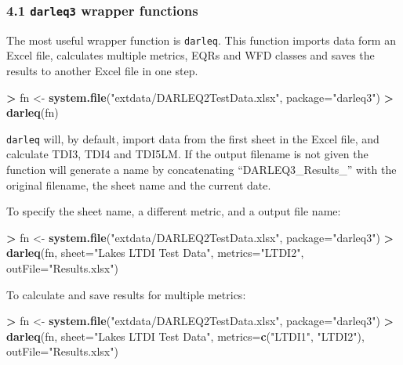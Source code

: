 \documentclass[
]{article}
\newenvironment{Shaded}{\begin{snugshade}}{\end{snugshade}}
\newcommand{\DataTypeTok}[1]{\textcolor[rgb]{0.13,0.29,0.53}{#1}}
\newcommand{\KeywordTok}[1]{\textcolor[rgb]{0.13,0.29,0.53}{\textbf{#1}}}
\newcommand{\NormalTok}[1]{#1}
\newcommand{\OperatorTok}[1]{\textcolor[rgb]{0.81,0.36,0.00}{\textbf{#1}}}
\newcommand{\StringTok}[1]{\textcolor[rgb]{0.31,0.60,0.02}{#1}}
\begin{document}
\hypertarget{darleq3-wrapper-functions}{%
\subsubsection{\texorpdfstring{4.1 \texttt{darleq3} wrapper
functions}{4.1 darleq3 wrapper functions}}\label{darleq3-wrapper-functions}}

The most useful wrapper function is \texttt{darleq}. This function
imports data form an Excel file, calculates multiple metrics, EQRs and
WFD classes and saves the results to another Excel file in one step.

\begin{Shaded}
\begin{Highlighting}[]
\OperatorTok{>}\StringTok{ }\NormalTok{fn <-}\StringTok{ }\KeywordTok{system.file}\NormalTok{(}\StringTok{"extdata/DARLEQ2TestData.xlsx"}\NormalTok{, }\DataTypeTok{package=}\StringTok{"darleq3"}\NormalTok{)}
\OperatorTok{>}\StringTok{ }\KeywordTok{darleq}\NormalTok{(fn)}
\end{Highlighting}
\end{Shaded}

\texttt{darleq} will, by default, import data from the first sheet in
the Excel file, and calculate TDI3, TDI4 and TDI5LM. If the output
filename is not given the function will generate a name by concatenating
``DARLEQ3\_Results\_'' with the original filename, the sheet name and
the current date.

To specify the sheet name, a different metric, and a output file name:

\begin{Shaded}
\begin{Highlighting}[]
\OperatorTok{>}\StringTok{ }\NormalTok{fn <-}\StringTok{ }\KeywordTok{system.file}\NormalTok{(}\StringTok{"extdata/DARLEQ2TestData.xlsx"}\NormalTok{, }\DataTypeTok{package=}\StringTok{"darleq3"}\NormalTok{)}
\OperatorTok{>}\StringTok{ }\KeywordTok{darleq}\NormalTok{(fn, }\DataTypeTok{sheet=}\StringTok{"Lakes LTDI Test Data"}\NormalTok{, }\DataTypeTok{metrics=}\StringTok{"LTDI2"}\NormalTok{, }\DataTypeTok{outFile=}\StringTok{"Results.xlsx"}\NormalTok{)}
\end{Highlighting}
\end{Shaded}

To calculate and save results for multiple metrics:

\begin{Shaded}
\begin{Highlighting}[]
\OperatorTok{>}\StringTok{ }\NormalTok{fn <-}\StringTok{ }\KeywordTok{system.file}\NormalTok{(}\StringTok{"extdata/DARLEQ2TestData.xlsx"}\NormalTok{, }\DataTypeTok{package=}\StringTok{"darleq3"}\NormalTok{)}
\OperatorTok{>}\StringTok{ }\KeywordTok{darleq}\NormalTok{(fn, }\DataTypeTok{sheet=}\StringTok{"Lakes LTDI Test Data"}\NormalTok{, }\DataTypeTok{metrics=}\KeywordTok{c}\NormalTok{(}\StringTok{"LTDI1"}\NormalTok{, }\StringTok{"LTDI2"}\NormalTok{), }\DataTypeTok{outFile=}\StringTok{"Results.xlsx"}\NormalTok{)}
\end{Highlighting}
\end{Shaded}
\end{document}
